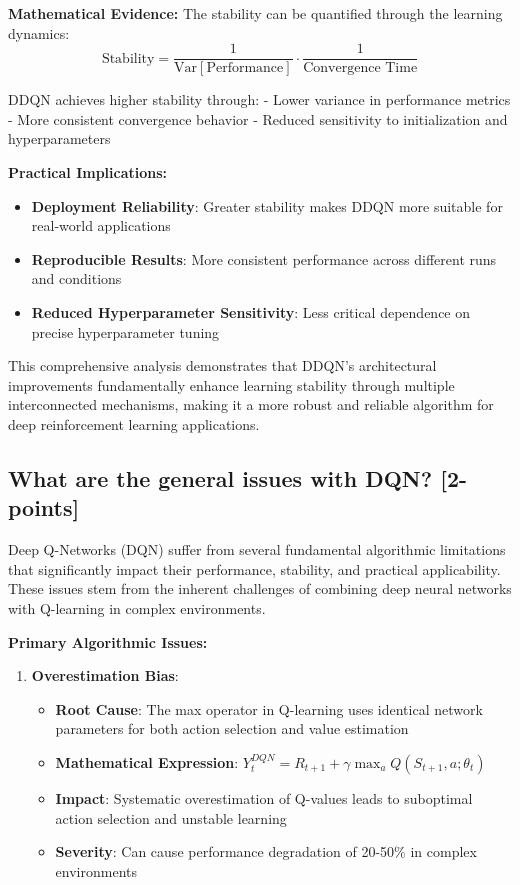 \documentclass[12pt]{article}
\begin{document}
{{{\textbf{Mathematical Evidence:}
The stability can be quantified through the learning dynamics:
$$\text{Stability} = \frac{1}{\text{Var}[\text{Performance}]} \cdot \frac{1}{\text{Convergence Time}}$$

DDQN achieves higher stability through:
- Lower variance in performance metrics
- More consistent convergence behavior
- Reduced sensitivity to initialization and hyperparameters

\textbf{Practical Implications:}
\begin{itemize}
    \item \textbf{Deployment Reliability}: Greater stability makes DDQN more suitable for real-world applications
    \item \textbf{Reproducible Results}: More consistent performance across different runs and conditions
    \item \textbf{Reduced Hyperparameter Sensitivity}: Less critical dependence on precise hyperparameter tuning
\end{itemize}

This comprehensive analysis demonstrates that DDQN's architectural improvements fundamentally enhance learning stability through multiple interconnected mechanisms, making it a more robust and reliable algorithm for deep reinforcement learning applications.

\subsection{What are the general issues with DQN? [2-points]}

Deep Q-Networks (DQN) suffer from several fundamental algorithmic limitations that significantly impact their performance, stability, and practical applicability. These issues stem from the inherent challenges of combining deep neural networks with Q-learning in complex environments.

\textbf{Primary Algorithmic Issues:}

\begin{enumerate}
    \item \textbf{Overestimation Bias}:
    \begin{itemize}
        \item \textbf{Root Cause}: The max operator in Q-learning uses identical network parameters for both action selection and value estimation
        \item \textbf{Mathematical Expression}: $Y_t^{DQN} = R_{t+1} + \gamma \max_a Q(S_{t+1}, a; \theta_t)$
        \item \textbf{Impact}: Systematic overestimation of Q-values leads to suboptimal action selection and unstable learning
        \item \textbf{Severity}: Can cause performance degradation of 20-50\% in complex environments
    \end{itemize}
    

\end{enumerate}}}}
\end{document}
